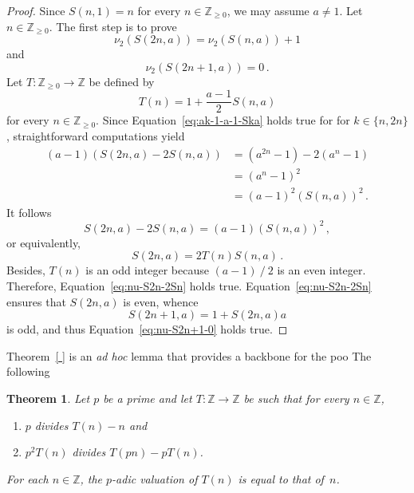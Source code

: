 \documentclass[12pt]{article}
\newcommand{\bZ}{\mathbb{Z}}
\newcommand{\bN}{\bZ_{\ge 0}}%
\newtheorem{theorem}{Theorem}
\theoremstyle{definition}
\begin{document}
\begin{proof}
  Since $S(n, 1) = n$ for every $n \in \bN$, we may assume $a \ne 1$.
  Let $n \in \bN$.
  The first step is to prove
  \begin{equation} \label{eq:nu-S2n-2Sn}
  \nu_2(S(2n, a)) = \nu_2(S(n, a)) + 1 
  \end{equation}
  and 
  \begin{equation}  \label{eq:nu-S2n+1-0}
    \nu_2(S(2n + 1, a)) = 0 \, .
  \end{equation}
  Let $T\colon \bN \to \bZ$ be defined by
  $$
  T(n) = 1 + \frac{a - 1}{2} S(n, a)
  $$
  for every $n \in \bN$.
  Since Equation~\eqref{eq:ak-1-a-1-Ska} holds true for 
  for $k \in \{ n, 2n \}$, straightforward computations yield
  \begin{align*}
    (a - 1) \left( S(2 n, a) - 2 S(n, a) \right) & = (a^{2n} - 1) - 2(a^n - 1) \\
                                                 & = {(a^n - 1)}^2 \\
                                                 & = {(a - 1)}^2 \left( S(n, a) \right)^2\,.
  \end{align*}
  It follows 
  $$
  S(2 n, a) - 2 S(n, a) = (a - 1) \left(  S(n, a) \right)^2 \,, 
  $$
  or equivalently,
  $$
  S(2 n, a) = 2 T(n) S(n, a) \, .
  $$
  Besides,  $T(n)$ is an odd integer because $(a - 1) \mathbin{/} 2$ is an even integer.
  Therefore, Equation~\eqref{eq:nu-S2n-2Sn} holds true.
  Equation~\eqref{eq:nu-S2n-2Sn} ensures that $S(2n, a)$ is even, whence
  $$
  S(2n + 1, a) = 1 + S(2n, a) a
  $$
  is odd, and thus Equation~\eqref{eq:nu-S2n+1-0} holds true.
\end{proof}

Theorem~\ref{ } is an \emph{ad hoc} lemma that provides a backbone for the poo The following 
\begin{theorem}
  Let $p$ be a prime and let $T\colon \bZ \to \bZ$ be such that for every $n \in \bZ$,
  \begin{enumerate}
  \item $p$ divides $T(n) - n$ and 
  \item $p^2 T(n)$ divides $T(pn) - p T(n)$.
  \end{enumerate} 
  For each $n \in \bZ$, the $p$-adic valuation of $T(n)$ is equal to that of~$n$.
\end{theorem}
\end{document}

